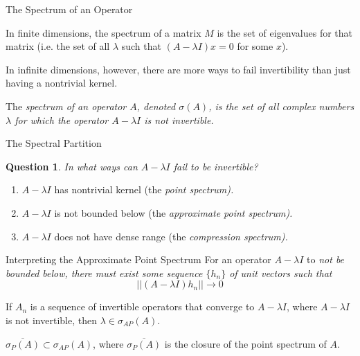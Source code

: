 \documentclass{beamer}
\newtheorem{question}{Question}[section]
\begin{document}
\begin{frame}{The Spectrum of an Operator}

    In finite dimensions, the spectrum of a matrix $M$ is the set of eigenvalues
    for that matrix (i.e. the set of all $\lambda$ such that $(A-\lambda I)x=0$
    for some $x$).

    In infinite dimensions, however, there are more ways to fail invertibility
    than just having a nontrivial kernel.
        \begin{definition}
            The \em spectrum \em of an operator $A$, denoted $\sigma(A)$, is the set of
            all complex numbers $\lambda$ for which the operator $A-\lambda I$ is not
            invertible.
        \end{definition}
\end{frame}

\begin{frame}{The Spectral Partition}
    \begin{question}
        In what ways can $A-\lambda I$ fail to be invertible?
    \end{question}

    \pause

        \begin{enumerate}
            \item $A-\lambda I$ has nontrivial kernel (the \em point spectrum\em).
                \pause
            \item $A-\lambda I$ is not bounded below (the \em approximate point
                spectrum\em).
                \pause
            \item $A-\lambda I$ does not have dense range (the \em compression
                spectrum\em).
        \end{enumerate}
\end{frame}

\begin{frame}{Interpreting the Approximate Point Spectrum}
    For an operator $A-\lambda I$ to \em not \em be bounded below, there must exist some
    sequence $\{h_n\}$ of unit vectors such that 
    \[
        ||(A-\lambda I)h_n|| \to 0
    \]

    \begin{theorem}
        If $A_n$ is a sequence of invertible operators that converge to
        $A-\lambda I$,
        where $A-\lambda I$ is not invertible, then
        $\lambda \in \sigma_{AP}(A)$.
    \end{theorem}

    \begin{theorem}
        $\overline{\sigma_P(A)} \subset \sigma_{AP}(A)$, where 
        $\overline{\sigma_P(A)}$ is the closure of the point spectrum of $A$.
    \end{theorem}
\end{frame}
\end{document}
